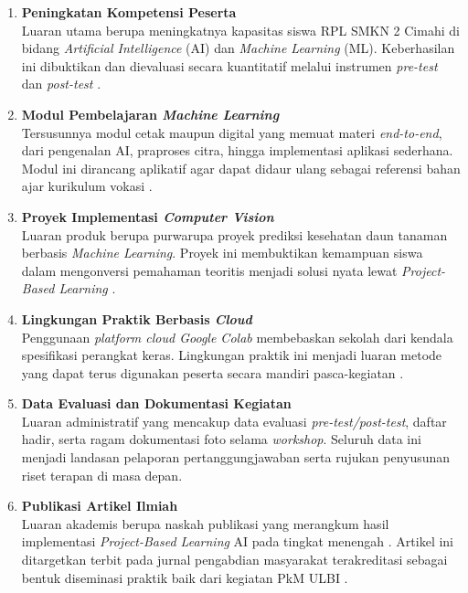 \begin{enumerate}
    \item \textbf{Peningkatan Kompetensi Peserta}\\
    Luaran utama berupa meningkatnya kapasitas siswa RPL SMKN 2 Cimahi di bidang \textit{Artificial Intelligence} (AI) dan \textit{Machine Learning} (ML). Keberhasilan ini dibuktikan dan dievaluasi secara kuantitatif melalui instrumen \textit{pre-test} dan \textit{post-test} \parencite{Utomo2024}.
    
    \item \textbf{Modul Pembelajaran \textit{Machine Learning}}\\
    Tersusunnya modul cetak maupun digital yang memuat materi \textit{end-to-end}, dari pengenalan AI, praproses citra, hingga implementasi aplikasi sederhana. Modul ini dirancang aplikatif agar dapat didaur ulang sebagai referensi bahan ajar kurikulum vokasi \parencite{PANE2025}.

    \item \textbf{Proyek Implementasi \textit{Computer Vision}}\\
    Luaran produk berupa purwarupa proyek prediksi kesehatan daun tanaman berbasis \textit{Machine Learning}. Proyek ini membuktikan kemampuan siswa dalam mengonversi pemahaman teoritis menjadi solusi nyata lewat \textit{Project-Based Learning} \parencite{Wahyudi2024, Imanulloh2023}.

    \item \textbf{Lingkungan Praktik Berbasis \textit{Cloud}}\\
    Penggunaan \textit{platform cloud Google Colab} membebaskan sekolah dari kendala spesifikasi perangkat keras. Lingkungan praktik ini menjadi luaran metode yang dapat terus digunakan peserta secara mandiri pasca-kegiatan \parencite{Handayani2025, Nugrahanti2025}.

    \item \textbf{Data Evaluasi dan Dokumentasi Kegiatan}\\
    Luaran administratif yang mencakup data evaluasi \textit{pre-test/post-test}, daftar hadir, serta ragam dokumentasi foto selama \textit{workshop}. Seluruh data ini menjadi landasan pelaporan pertanggungjawaban serta rujukan penyusunan riset terapan di masa depan.

    \item \textbf{Publikasi Artikel Ilmiah}\\
    Luaran akademis berupa naskah publikasi yang merangkum hasil implementasi \textit{Project-Based Learning} AI pada tingkat menengah \parencite{Panjaitan2025}. Artikel ini ditargetkan terbit pada jurnal pengabdian masyarakat terakreditasi sebagai bentuk diseminasi praktik baik dari kegiatan PkM ULBI \parencite{Ali2025}.
\end{enumerate}
